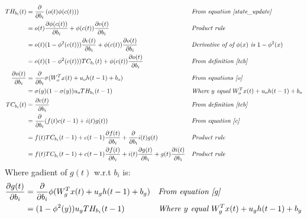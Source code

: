 \documentclass[twoside,11pt]{article}
\begin{document}
\begin{align*}
TH_{b_i}(t) & = \frac{\partial}{\partial b_i} \left ( o(t) \phi(c(t)) \right ) && \textit{From equation \ref{state_update}} \\
& = o(t) \frac{\partial \phi(c(t))}{\partial b_i}  + \phi(c(t)) \frac{\partial o(t)}{\partial b_i}   && \textit{Product rule} \\
&= o(t) (1-\phi^{2}(c(t))) \frac{\partial c(t)}{\partial b_i}  + \phi(c(t)) \frac{\partial o(t)}{\partial b_i}   && \textit{Derivative of of $\phi(x)$ is $1-\phi^2(x)$}\\ 
&= o(t) (1-\phi^{2}(c(t))) TC_{b_i}(t)  + \phi(c(t)) \frac{\partial o(t)}{\partial b_i}   && \textit{From definition \ref{tcb} }\\ 
\frac{\partial o(t)}{\partial b_i} &=  \frac{\partial}{\partial b_i} \sigma(W_{o}^T x(t) + u_{o} h(t-1) + b_o) && \textit{From equations \ref{o}}\\
&= \sigma(y)(1-\sigma(y))u_o TH_{b_i}(t-1) && \textit{Where $y$ equal $W_{o}^T x(t) + u_{o} h(t-1) + b_o$} \\
TC_{b_i}(t) &=  \frac{\partial c(t)}{\partial b_i} && \textit{From definition \ref{tcb}} \\ 
&=  \frac{\partial}{\partial b_i} (f(t)  c(t-1) + i(t) g(t))  && \textit{From equation \ref{c}} \\
&= f(t) TC_{b_i}(t-1) + c(t-1)\frac{\partial f(t)}{ \partial b_i} + \frac{\partial}{\partial b_i}  i(t) g(t)   && \textit{Product rule}\\
&= f(t) TC_{b_i}(t-1) + c(t-1)\frac{\partial f(t)}{ \partial b_i} + i(t)\frac{\partial g(t) }{\partial b_i}  + g(t)\frac{\partial i(t) }{\partial b_i}  && \textit{Product rule} 
\end{align*}
Where gadient of  $g(t)$  w.r.t $b_i$ is:
\begin{align*}
\frac{\partial g(t)}{\partial b_i} &=  \frac{\partial}{\partial b_i} \phi(W_{g}^T x(t) + u_{g} h(t-1) + b_g) && \textit{From equation \ref{g}} \\
&= (1-\phi^2(y))u_g TH_{b_i}(t-1) && \textit{Where $y$ equal $W_{g}^T x(t) + u_{g} h(t-1) + b_g$} \\
\end{align*}
\end{document}
